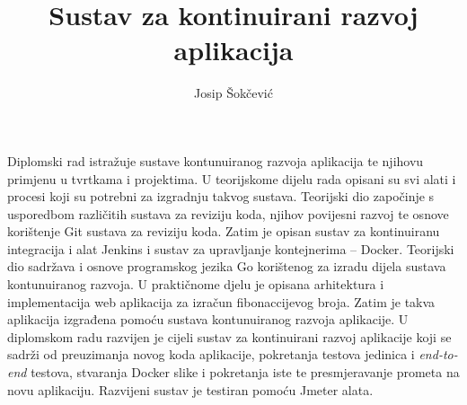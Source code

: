\documentclass[times, utf8, numeric, diplomski]{ferit}
\begin{document}
\sloppy
\title{Sustav za kontinuirani razvoj aplikacija}

\author{Josip Šokčević}
\maketitle






\tableofcontents














\begin{sazetak}
    Diplomski rad istražuje sustave kontunuiranog razvoja aplikacija te njihovu primjenu u tvrtkama
    i projektima. U teorijskome dijelu rada opisani su svi alati i procesi koji su potrebni za
    izgradnju takvog sustava. Teorijski dio započinje s usporedbom različitih sustava za reviziju
    koda, njihov povijesni razvoj te osnove korištenje Git sustava za reviziju koda. Zatim je opisan
    sustav za kontinuiranu integracija i alat Jenkins i sustav za upravljanje kontejnerima --
    Docker. Teorijski dio sadržava i osnove programskog jezika Go korištenog za izradu dijela
    sustava kontunuiranog razvoja. U praktičnome djelu je opisana arhitektura i implementacija web
    aplikacija za izračun fibonaccijevog broja. Zatim je takva aplikacija izgrađena pomoću sustava
    kontunuiranog razvoja aplikacije. U diplomskom radu razvijen je cijeli sustav za kontinuirani
    razvoj aplikacije koji se sadrži od preuzimanja novog koda aplikacije, pokretanja testova
    jedinica i \textit{end-to-end} testova, stvaranja Docker slike i pokretanja iste te
    presmjeravanje prometa na novu aplikaciju. Razvijeni sustav je testiran pomoću Jmeter alata.

\end{sazetak}
\end{document}
